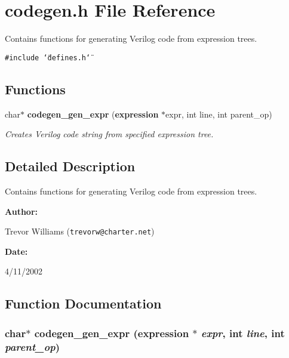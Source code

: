 \section{codegen.h File Reference}
\label{codegen_8h}
Contains functions for generating Verilog code from expression trees. 


{\tt \#include \char`\"{}defines.h\char`\"{}}\par
\subsection*{Functions}
\begin{CompactItemize}
\item 
char$\ast$ {\bf codegen\_\-gen\_\-expr} ({\bf expression} $\ast$expr, int line, int parent\_\-op)
\begin{CompactList}\small\item\em Creates Verilog code string from specified expression tree.\item\end{CompactList}\end{CompactItemize}


\subsection{Detailed Description}
Contains functions for generating Verilog code from expression trees.



\begin{Desc}
\item[{\bf Author: }]\par
Trevor Williams ({\tt trevorw@charter.net}) \end{Desc}
\begin{Desc}
\item[{\bf Date: }]\par
4/11/2002

\end{Desc}


\subsection{Function Documentation}
\subsubsection{\setlength{\rightskip}{0pt plus 5cm}char$\ast$ codegen\_\-gen\_\-expr ({\bf expression} $\ast$ {\em expr}, int {\em line}, int {\em parent\_\-op})}\label{codegen_8h_a0}


